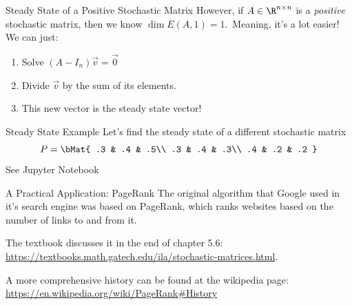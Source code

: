 \documentclass[xcoler=dvipsnames, aspectratio=169]{beamer}
\begin{document}
    \begin{frame}{Steady State of a Positive Stochastic Matrix}
        However, if $A\in\R^{n\times n}$ is a \emph{positive} stochastic matrix, then we know
        $\dim{E(A,1)} = 1$.\pause\ Meaning, it's a lot easier! We can just:
        \begin{enumerate}
            \pause\item Solve $(A-I_n)\vec{v}=\vec{0}$
            \pause\item Divide $\vec{v}$ by the sum of its elements.
            \pause\item This new vector is the steady state vector!
        \end{enumerate}
    \end{frame}
    \begin{frame}{Steady State Example}
        Let's find the steady state of a different stochastic matrix
        \[
            P = \bMat{
                .3 & .4 & .5\\
                .3 & .4 & .3\\
                .4 & .2 & .2
            }
        \]
        See Jupyter Notebook
    \end{frame}
    \begin{frame}{A Practical Application: PageRank}
        The original algorithm that Google used in it's search engine was based on PageRank, which
        ranks websites based on the number of links to and from it.

        \vspace{10pt}

        The textbook discusses it in the end of chapter 5.6: \url{https://textbooks.math.gatech.edu/ila/stochastic-matrices.html}.

        \vspace{10pt}

        A more comprehensive history can be found at the wikipedia page: \url{https://en.wikipedia.org/wiki/PageRank\#History}
    \end{frame}
\end{document}
